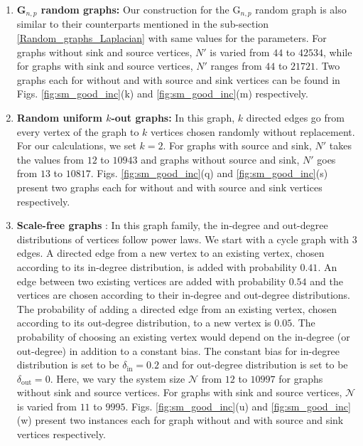 \documentclass[%
 reprint,
 superscriptaddress,
 amsmath,amssymb,
 aps,
 pra,
floatfix,
nofootinbib,
]{revtex4-2}
\theoremstyle{definition}
\theoremstyle{remark}
\begin{document}
\begin{appendix}
\begin{enumerate}
    \item 
    \textbf{G$_{n, p}$ random graphs:} 
    Our construction for the G$_{n, p}$ random graph is also similar to their counterparts mentioned in the sub-section \ref{Random_graphs_Laplacian} with same values for the parameters. For graphs without sink and source vertices, $N'$ is varied from $44$ to $42534$, while for graphs with sink and source vertices, $N'$ ranges from $44$ to $21721$. Two graphs each for without and with source and sink vertices can be found in Figs. \ref{fig:sm_good_inc}(k) and \ref{fig:sm_good_inc}(m) respectively.
    
    \item 
    \textbf{Random uniform $k$-out graphs:} 
    In this graph, $k$ directed edges go from every vertex of the graph to $k$ vertices chosen randomly without replacement. For our calculations, we set $k = 2$. For graphs with source and sink, $N'$ takes the values from $12$ to $10943$ and graphs without source and sink, $N'$ goes from $13$ to $10817$. Figs. \ref{fig:sm_good_inc}(q) and \ref{fig:sm_good_inc}(s) present two graphs each for without and with source and sink vertices respectively.
    
    \item 
    \textbf{Scale-free graphs} 
    \cite{bollobas2003directed}: In this graph family, the in-degree and out-degree distributions of vertices follow power laws. We start with a cycle graph with 3 edges. A directed edge from a new vertex to an existing vertex, chosen according to its in-degree distribution, is added with probability $0.41$. An edge between two existing vertices are added with probability $0.54$ and the vertices are chosen according to their in-degree and out-degree distributions. The probability of adding a directed edge from an existing vertex, chosen according to its out-degree distribution, to a new vertex is $0.05$. The probability of choosing an existing vertex would depend on the in-degree (or out-degree) in addition to a constant bias. The constant bias for in-degree distribution is set to be $\delta_{\mathrm{in}} = 0.2$ and for out-degree distribution is set to be $\delta_{\mathrm{out}}=0$. Here, we vary the system size $\mathcal{N}$ from $12$ to $10997$ for graphs without sink and source vertices. For graphs with sink and source vertices, $\mathcal{N}$ is varied from $11$ to $9995$. Figs. \ref{fig:sm_good_inc}(u) and \ref{fig:sm_good_inc}(w) present two instances each for graph without and with source and sink vertices respectively.
\end{enumerate} 


\end{appendix}
\end{document}
